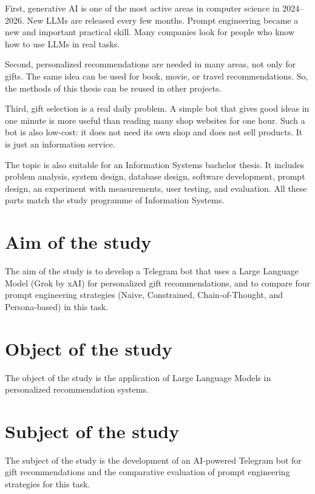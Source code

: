 First, generative AI is one of the most active areas in computer science in 2024--2026. New LLMs are released every few months. Prompt engineering became a new and important practical skill. Many companies look for people who know how to use LLMs in real tasks.

Second, personalized recommendations are needed in many areas, not only for gifts. The same idea can be used for book, movie, or travel recommendations. So, the methods of this thesis can be reused in other projects.

Third, gift selection is a real daily problem. A simple bot that gives good ideas in one minute is more useful than reading many shop websites for one hour. Such a bot is also low-cost: it does not need its own shop and does not sell products. It is just an information service.

The topic is also suitable for an Information Systems bachelor thesis. It includes problem analysis, system design, database design, software development, prompt design, an experiment with measurements, user testing, and evaluation. All these parts match the study programme of Information Systems.

\section*{Aim of the study}

The aim of the study is to develop a Telegram bot that uses a Large Language Model (Grok by xAI) for personalized gift recommendations, and to compare four prompt engineering strategies (Naive, Constrained, Chain-of-Thought, and Persona-based) in this task.

\section*{Object of the study}

The object of the study is the application of Large Language Models in personalized recommendation systems.

\section*{Subject of the study}

The subject of the study is the development of an AI-powered Telegram bot for gift recommendations and the comparative evaluation of prompt engineering strategies for this task.

